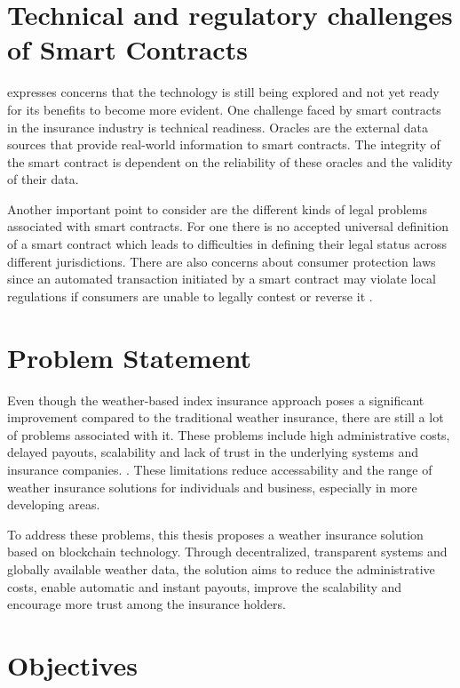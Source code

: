  \section{Technical and regulatory challenges of Smart Contracts}\label{section:regulatory_technical_challenges}
 
 \autocite{gatteschi2018blockchain} expresses concerns that the technology is still being explored and not yet ready for its benefits to become more evident. One challenge faced by smart contracts in the insurance industry is technical readiness. Oracles are the external data sources that provide real-world information to smart contracts. The integrity of the smart contract is dependent on the reliability of these oracles and the validity of their data. 
 
 Another important point to consider are the different kinds of legal problems associated with smart contracts. For one there is no accepted universal definition of a smart contract which leads to difficulties in defining their legal status across different jurisdictions. There are also concerns about consumer protection laws since an automated transaction initiated by a smart contract may violate local regulations if consumers are unable to legally contest or reverse it \autocite{ferreira2021regulating}.



\section{Problem Statement}\label{section:problem_statement}
Even though the weather-based index insurance approach poses a significant improvement compared to the traditional weather insurance, there are still a lot of problems associated with it. These problems include high administrative costs, delayed payouts, scalability and lack of trust in the underlying systems and insurance companies. \autocite{skees2008challenges}. These limitations reduce accessability and the range of weather insurance solutions for individuals and business, especially in more developing areas.

To address these problems, this thesis proposes a weather insurance solution based on blockchain technology. Through decentralized, transparent systems and globally available weather data, the solution aims to reduce the administrative costs, enable automatic and instant payouts, improve the scalability and encourage more trust among the insurance holders.

\section{Objectives}\label{section:objectives}

